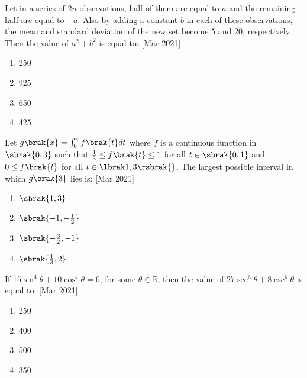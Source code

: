 \item{
        	
        	Let in a series of $2n$ observations, half of them are equal to $a$ and the remaining half are equal to $-a$. Also by adding a constant $b$ in each of these observations, the mean and standard deviation of the new set become $5$ and $20$, respectively. Then the value of $a^2 + b^2$ is equal to:
        	\hfill
        	{[Mar 2021]}
        	\begin{multicols}{4}
        		\begin{enumerate}
        			\item 250
        			\item 925
        			\item 650
        			\item 425
        		\end{enumerate}
        	\end{multicols}
        	
        }
    \item{
     
            Let $g\brak{x} = \int_{0}^{x} f\brak{t} dt$ where $f$ is a continuous function in $\sbrak{0, 3}$ such that $\frac{1}{3} \leq f\brak{t} \leq 1$ for all $t \in \sbrak{0, 1}$ and $0 \leq f\brak{t}$ for all $t \in \lbrak1, 3\rsbrak{}$. The largest possible interval in which $g\brak{3}$ lies is:\hfill
                {[Mar 2021]}
            \begin{multicols}{4}
                \begin{enumerate}
                    \item $\sbrak{1, 3}$
                    
                    \item $\sbrak{-1, -\frac{1}{2}}$
                    
                    \item $\sbrak{-\frac{3}{2}, -1}$
                    
                    \item $\sbrak{\frac{1}{3}, 2}$
                \end{enumerate}
            \end{multicols}
        
        }
    \item{
            If $15 \sin^4 \theta + 10 \cos^4 \theta = 6$, for some $\theta \in \mathbb{R}$, then the value of $27 \sec^6 \theta + 8 \csc^6 \theta$ is equal to:
           	\hfill
                {[Mar 2021]}
            
            \begin{multicols}{4}
				\begin{enumerate}
					\item 250
					\item 400
					\item 500
					\item 350
				\end{enumerate}
			\end{multicols}
        
        }
